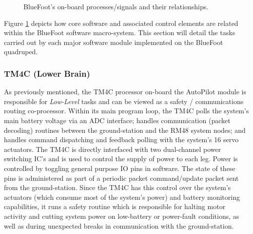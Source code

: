 		\begin{figure}[h!]
			\centering
			\caption{BlueFoot's on-board processes/signals and their relationships.}
			\label{fig::process_diagram}
		\end{figure}

		Figure \ref{fig::process_diagram} depicts how core software and associated control elements are related within the BlueFoot software macro-system. This section will detail the tasks carried out by each major software module implemented on the BlueFoot quadruped.

		\subsubsection{TM4C (Lower Brain)}

			As previously mentioned, the TM4C processor on-board the AutoPilot module is responsible for \emph{Low-Level} tasks and can be viewed as a safety / communications routing co-processor. Within its main program loop, the TM4C polls the system's main battery voltage via an ADC interface; handles communication (packet decoding) routines between the ground-station and the RM48 system nodes; and handles command dispatching and feedback polling with the system's 16 servo actuators. The TM4C is directly interfaced with two dual-channel power switching IC's and is used to control the supply of power to each leg. Power is controlled by toggling general purpose IO pins in software. The state of these pins is administered as part of a periodic packet command/update packet sent from the ground-station. Since the TM4C has this control over the system's actuators (which consume most of the system's power) and battery monitoring capabilities, it runs a safety routine which is responsible for halting motor activity and cutting system power on low-battery or power-fault conditions, as well as during unexpected breaks in communication with the ground-station.

